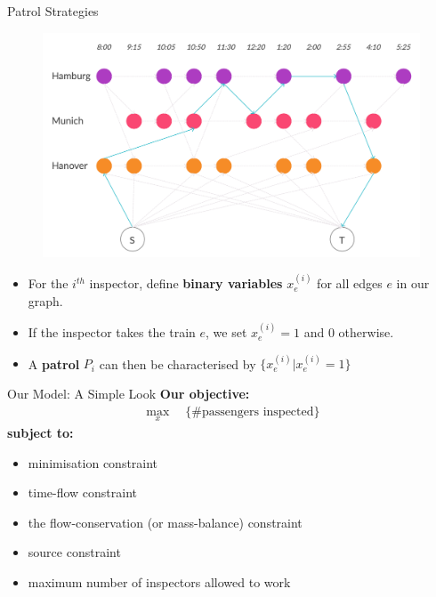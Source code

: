 \documentclass[handout]{beamer}
\begin{document}
\begin{frame}{Patrol Strategies}
\begin{figure}
    \centering
    \includegraphics[scale=.09]{Inspector_Patrol_Binary.jpg}
\end{figure}
\begin{itemize}
    \item For the $i^{th}$ inspector, define \textbf{binary variables} $x_e^{(i)}$ for all edges $e$ in our graph.
    \item  If the inspector takes the train $e$, we set $x_e^{(i)} = 1$ and $0$ otherwise.
    \item A \textbf{patrol} $P_i$ can then be characterised by $\{x_e^{(i)}| x_e^{(i)} = 1 \}$ 
\end{itemize}
\end{frame}


\begin{frame}{Our Model: A Simple Look}
    \textbf{Our objective:}
\begin{align*}
    \max_x\quad \{\#\text{passengers inspected}\}
\end{align*}
\textbf{subject to:}
\begin{itemize}
    \item minimisation constraint
    \item time-flow constraint
    \item the flow-conservation (or mass-balance) constraint
    \item source constraint
    \item maximum number of inspectors allowed to work
\end{itemize}
\end{frame}
\end{document}

